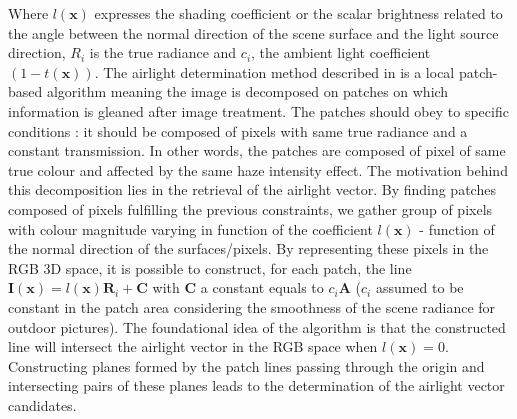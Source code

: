 \documentclass[conference]{IEEEtran}
\begin{document}
Where $l(\mathbf{x})$ expresses the shading coefficient or the scalar brightness related to the angle between the normal direction of the scene surface and
the light source direction, $R_i$ is the true radiance and $c_i$, the ambient light coefficient $(1-t(\mathbf{x}))$.
The airlight determination method described in \cite{airlight} is a local patch-based algorithm meaning the image is decomposed on patches on which information is
gleaned after image treatment.  The patches should obey to specific conditions : it should be composed of pixels with same
true radiance and a constant transmission. In other words, the patches are composed of pixel of same true colour and affected
by the same haze intensity effect. The motivation behind this decomposition lies in the retrieval of the airlight
vector.  By finding patches composed of pixels fulfilling the previous constraints, we gather group of pixels with colour magnitude
varying in function of the coefficient $l(\mathbf{x})$ - function of the normal direction of the surfaces/pixels.  By representing these pixels in the RGB 3D space, it is possible to construct, for each patch, the line $\mathbf{I}(\mathbf{x}) = l(\mathbf{x}) \mathbf{R}_i + \mathbf{C}$ 
with $\mathbf{C}$ a constant equals to $c_i \mathbf{A}$ ($c_i$ assumed to be constant in the patch area considering the smoothness of the scene radiance for outdoor pictures).
The foundational idea of the algorithm is that the constructed line will intersect the airlight vector in the RGB space when $l(\mathbf{x}) = 0$.
Constructing planes formed by the patch lines passing through the origin and intersecting pairs of these planes leads to the determination of the airlight vector candidates.
\end{document}
